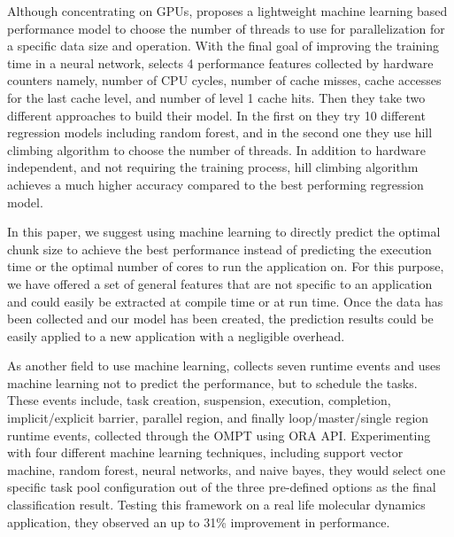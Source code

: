 Although concentrating on GPUs,	\cite{liu2018runtime} proposes a lightweight machine learning based performance model to choose the number of threads to use for parallelization for a specific data size and operation. With the final goal of improving the training time in a neural network, \cite{liu2018runtime} selects 4 performance features collected by hardware counters namely, number of CPU cycles, number of cache misses, cache accesses for the last cache level, and number of level 1 cache hits. Then they take two different approaches to build their model. In the first on they try 10 different regression models including random forest, and in the second one they use hill climbing algorithm to choose the number of threads. In addition to hardware independent, and not requiring the training process, hill climbing algorithm achieves a much higher accuracy compared to the best performing regression model.

In this paper, we suggest using machine learning to directly predict the optimal chunk size to achieve the best performance instead of predicting the execution time or the optimal number of cores to run the application on. For this purpose, we have offered a set of general features that are not specific to an application and could easily be extracted at compile time or at run time. Once the data has been collected and our model has been created, the prediction results could be easily applied to a new application with a negligible overhead. 

As another field to use machine learning, \cite{qawasmeh2015adaptive} collects seven runtime events and uses machine learning not to predict the performance, but to schedule the tasks. These events include, task creation, suspension, execution, completion, implicit/explicit barrier, parallel region, and finally loop/master/single region runtime events, collected through the OMPT using ORA API. Experimenting with four different machine learning techniques, including support vector machine, random forest, neural networks, and naive bayes, they would select one specific task pool configuration out of the three pre-defined options as the final classification result. Testing this framework on a real life molecular dynamics application, they observed an up to 31\% improvement in performance. 

